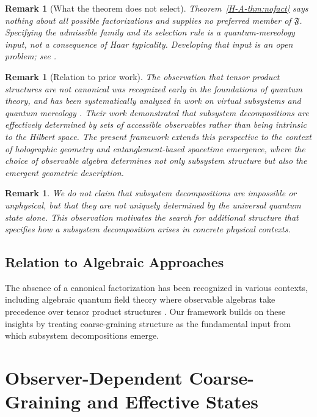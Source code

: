 \documentclass[12pt,a4paper,openany]{book}
\newtheorem{remark}[theorem]{Remark}
\begin{document}
\begin{remark}[What the theorem does not select]
Theorem~\ref{H-A-thm:nofact} says nothing about all possible factorizations and supplies no preferred member of $\mathfrak F$.  Specifying the admissible family and its selection rule is a quantum-mereology input, not a consequence of Haar typicality.  Developing that input is an open problem; see \cite{Cotler2019,CarrollSingh2021}.
\end{remark}

\begin{remark}[Relation to prior work]
The observation that tensor product structures are not canonical was recognized early in the foundations of quantum theory, and has been systematically analyzed in work on virtual subsystems and quantum mereology \cite{Zanardi2001,Zanardi2004,Cotler2019,CarrollSingh2021}.
Their work demonstrated that subsystem decompositions are effectively determined by sets of accessible observables rather than being intrinsic to the Hilbert space.
The present framework extends this perspective to the context of holographic geometry and entanglement-based spacetime emergence, where the choice of observable algebra determines not only subsystem structure but also the emergent geometric description.
\end{remark}

\begin{remark}
We do not claim that subsystem decompositions are impossible or unphysical, but that they are not uniquely determined by the universal quantum state alone. 
This observation motivates the search for additional structure that specifies how a subsystem decomposition arises in concrete physical contexts.
\end{remark}

\subsection{Relation to Algebraic Approaches}

The absence of a canonical factorization has been recognized in various contexts, including algebraic quantum field theory where observable algebras take precedence over tensor product structures \cite{Haag1996}.
Our framework builds on these insights by treating coarse-graining structure as the fundamental input from which subsystem decompositions emerge.

\section{Observer-Dependent Coarse-Graining and Effective States}
\label{H-A-sec:coarse}
\end{document}
